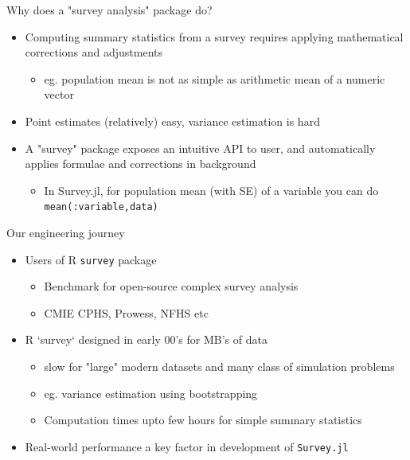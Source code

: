 \documentclass{beamer}          %
\begin{document}
\begin{frame}{Why does a "survey analysis" package do?}  
	\begin{itemize}
	\item Computing summary statistics from a survey requires  applying mathematical corrections and adjustments
  	\begin{itemize}
  		\item eg. population mean is not as simple as arithmetic mean of a numeric vector
  	\end{itemize}
  	\item Point estimates (relatively) easy, variance estimation is hard
  	\item A "survey" package exposes an intuitive API to user, and automatically applies formulae and corrections in background
   	\begin{itemize}
  		\item In Survey.jl, for population mean (with SE) of a variable you can do \texttt{mean(:variable,data)}
  	\end{itemize}
	\end{itemize}
\end{frame}

\begin{frame}{Our engineering journey}
\begin{itemize}
  \item Users of R \texttt{survey} package
  	\begin{itemize}
  		\item Benchmark for open-source complex survey analysis
  		\item CMIE CPHS, Prowess, NFHS etc
  	\end{itemize}	
  \item R `survey` designed in early 00's for MB's of data 
	\begin{itemize}
  		\item slow for "large" modern datasets and many class of simulation problems
  		\item eg. variance estimation using bootstrapping
  		\item Computation times upto few hours for simple summary statistics
   	\end{itemize}
   	\item Real-world performance a key factor in development of \texttt{Survey.jl}
\end{itemize}
\end{frame}
\end{document}
